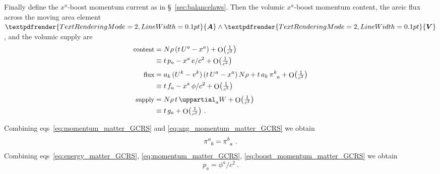 \documentclass[\ifafour a4paper,12pt,\else a5paper,10pt,\fi%
onecolumn,oneside,article,%
british%
]{memoir}
\makeatletter
\theoremstyle{remark}
\theoremstyle{innote}
\def\sum{\DOTSI\sumop\slimits@}
\newcommand*{\mathte}[1]{\textbf{\textit{\textsf{#1}}}}
\renewcommand*{\bm}[1]{\textpdfrender{TextRenderingMode=2,LineWidth=0.1pt}{\boldsymbol{#1}}}
\newcommand*{\de}{\uppartial}%
\DeclareMathOperator{\Ord}{O}%
\newcommand*{\p}{\mathrm{p}}%
\renewcommand*{\|}[1][]{\nonscript\:#1\vert\nonscript\:\mathopen{}}
\newcommand*{\sect}{\S}%
\newcommand*{\eqns}{eqs}%
\newcommand*{\tsum}{\mathop{\textstyle\sum}\nolimits}
\renewcommand*{\i}{{}\indices}
\newcommand*{\yu}{\bm{u}}
\newcommand*{\yo}{\bm{\omega}}
\newcommand*{\yW}{W}
\newcommand*{\yF}{\mathte{F}}
\newcommand*{\yE}{\bm{E}}
\newcommand*{\Oc}[1]{\Ord\bigl(\tfrac{1}{c^{#1}}\bigr)}
\makeatother
\begin{document}
Finally define the $x^{a}$-boost momentum current as in \sect~\ref{sec:balancelaws}. Then the volumic $x^{a}$-boost momentum content, the areic flux across the moving area element $\bm{A}\land\bm{V}$, and the volumic supply are
\begin{equation}
  \label{eq:boost_momentum_matter_GCRS}
  \begin{aligned}
    \text{\small content}&= N\rho\, (t\,U^{a} - x^{a}) + \Oc{2}
    \\
    &\equiv t\,p_{a} - x^{a}\,e/c^{2} + \Oc{2}
    \\[\jot]
    \text{\small flux}&=
    \!\begin{multlined}[t][0.8\linewidth]
      a_{k}\,(U^{k}-v^{k}) \, (t\,U^{a} - x^{a}) \,N\rho +
      t\,a_{k}\,\pi\i{^{k}_{a}}  + \Oc{2}
    \end{multlined}
    \\
    &\equiv t\,f_{a} - x^{a}\,\phi/c^{2} + \Oc{2}
    \\[\jot]
    \text{\small supply}&= N\rho\,t\,\de_{a}\yW+ \Oc{2} 
    \\
    &\equiv t\,g_{a} + \Oc{2} \ .
  \end{aligned}
\end{equation}

Combining \eqns~\eqref{eq:momentum_matter_GCRS} and \eqref{eq:ang_momentum_matter_GCRS} we obtain
\begin{equation}
  \label{eq:stress_sym_GCRS}
  \pi\i{^{a}_{b}} = \pi\i{^{b}_{a}} \ .
\end{equation}
Combining \eqns~\eqref{eq:energy_matter_GCRS}, \eqref{eq:momentum_matter_GCRS}, \eqref{eq:boost_momentum_matter_GCRS} we obtain
\begin{equation}
  \label{eq:equiv_mom_enflux_GCRS}
  p_{a} = \phi^{a}/c^{2} \ .
\end{equation}



\end{document}
